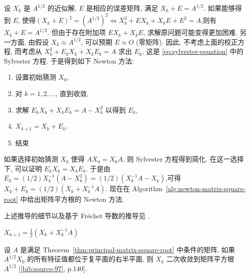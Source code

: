 {设 $X_k$ 是 $A^{1/2}$ 的近似解, $E$ 是相应的误差矩阵, 满足 $X_k+E=A^{1/2}$. 如果能够得到 $E$, 使得\newline{}$(X_k+E)^2=(A^{1/2})^2\Leftrightarrow X_k^2+EX_k+X_kE+E^2=A$,\newline{}则有 $X_k+E=A^{1/2}$. 但由于存在附加项 $EX_k+X_kE$, 求解原问题可能变得更加困难. 另一方面, 由假设 $X_k\approx A^{1/2}$, 可以预期 $E\approx O$ (零矩阵). 因此, 不考虑上面的校正方程, 而考虑从 $X_k^2+E_kX_k+X_kE_k=A$ 求出 $E_k$, 这是 \eqref{eq:sylvester-equation} 中的 Sylvester 方程. 于是得到如下 Newton 方法:}
\begin{enumerate}[label=\arabic*.]
\item {设置初始猜测 $X_0$,}
\item {对 $k=1,2,\ldots$, 直到收敛,}
\item {求解 $E_kX_k+X_kE_k=A-X_k^2$ 以得到 $E_k$,}
\item $X_{k+1}=X_k+E_k$.
\item {结束}
\end{enumerate}

{如果选择初始猜测 $X_0$ 使得 $AX_0=X_0A$, 则 Sylvester 方程得到简化. 在这一选择下, 可以证明 $E_kX_k=X_kE_k$. 于是由\newline{}$E_k=(1/2)X_k^{-1}(A-X_k^2)=(1/2)(X_k^{-1}A-X_k)$,\newline{}可得 $X_k+E_k=(1/2)(X_k+X_k^{-1}A)$. 现在在 Algorithm~\ref{alg:newton-matrix-square-root} 中给出矩阵平方根的 Newton 方法.}

{上述推导的细节以及基于 Fréchet 导数的推导见 .}

\begin{algorithm}[H]\caption{{(迭代法) 求 $X=A^{1/2}$ 的 Newton 方法}}\label{alg:newton-matrix-square-root}\begin{algorithmic}[1]
\State $X_{k+1}=\frac{1}{2}(X_k+X_k^{-1}A)$
\EndFor
\end{algorithmic}\end{algorithm}

{设 $A$ 是满足 Theorem~\ref{thm:principal-matrix-square-root} 中条件的矩阵. 如果 $A^{1/2}X_0$ 的所有特征值都位于复平面的右半平面, 则 $X_k$ 二次收敛到矩阵平方根 $A^{1/2}$ [\hyperref[bib:source-97]{\ref*{bib:source-97}}, p.140].}


